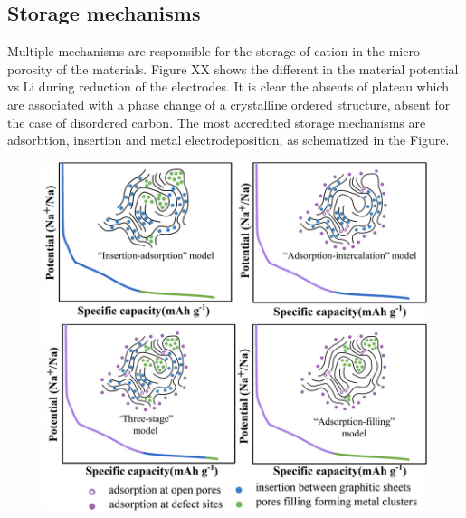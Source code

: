 \subsection{Storage mechanisms}
Multiple mechanisms are responsible for the storage of cation in the micro-porosity of the materials. Figure XX shows the different in the material potential vs Li during reduction of the electrodes. It is clear the absents of plateau which are associated with a phase change of a crystalline ordered structure, absent for the case of disordered carbon.
The most accredited storage mechanisms are adsorbtion, insertion and metal electrodeposition, as schematized in the Figure.
\begin{figure}
    \includegraphics[width = \linewidth]{figures/application3/image3.png}
\end{figure}
